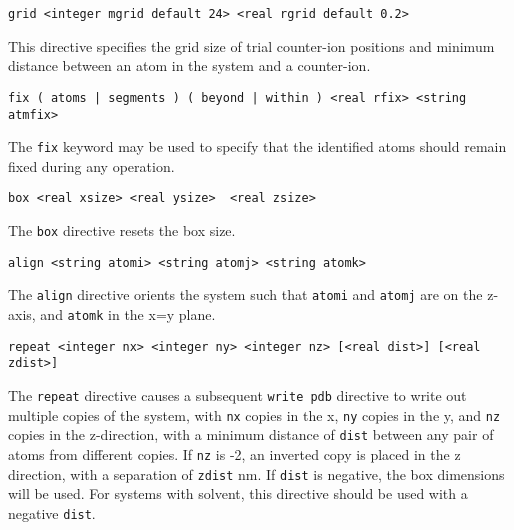 \begin{verbatim}
grid <integer mgrid default 24> <real rgrid default 0.2>
\end{verbatim}

This directive specifies the grid size of trial counter-ion positions and 
minimum distance between an atom in the system and a counter-ion. 

\begin{verbatim}
fix ( atoms | segments ) ( beyond | within ) <real rfix> <string atmfix>
\end{verbatim}

The \verb+fix+ keyword may be used to specify that the identified
atoms should remain fixed during any operation.

\begin{verbatim}
box <real xsize> <real ysize>  <real zsize>
\end{verbatim}

The \verb+box+ directive resets the box size.

\begin{verbatim}
align <string atomi> <string atomj> <string atomk>
\end{verbatim}

The \verb+align+ directive orients the system such that
\verb+atomi+ and \verb+atomj+ are on the z-axis, and \verb+atomk+
in the x=y plane.

\begin{verbatim}
repeat <integer nx> <integer ny> <integer nz> [<real dist>] [<real zdist>]
\end{verbatim}

The \verb+repeat+ directive causes a subsequent \verb+write pdb+
directive to write out multiple copies of the system, with \verb+nx+
copies in the x, \verb+ny+ copies in the y, and \verb+nz+ copies in 
the z-direction, with a minimum distance of \verb+dist+ between any
pair of atoms from different copies. If \verb+nz+ is -2, an inverted
copy is placed in the z direction, with a separation of \verb+zdist+ nm. 
If \verb+dist+ is negative, the box dimensions will be used. 
For systems with solvent, this directive should be used with a negative 
\verb+dist+.
